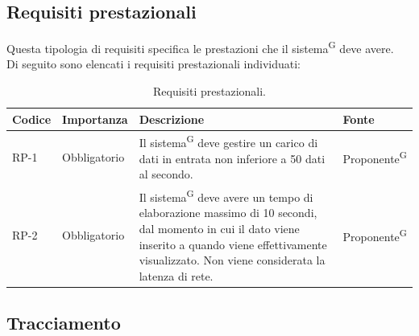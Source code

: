 \documentclass[8pt]{article}
\newcommand{\glossterm}[1]{#1\textsuperscript{G}} %
\begin{document}
\subsection{Requisiti prestazionali}
Questa tipologia di requisiti specifica le prestazioni che il \glossterm{sistema} deve avere. \\
Di seguito sono elencati i requisiti prestazionali individuati:
\begin{longtable}{|>{\centering\arraybackslash}p{1.2cm}|>{\centering\arraybackslash}p{2cm}|>{\centering\arraybackslash}p{8.5cm}|>{\centering\arraybackslash}p{3cm}|}
    \hline
    \rowcolor{white}
    \textbf{Codice} & \textbf{Importanza} & \textbf{Descrizione} & \textbf{Fonte} \\
		\hline
  \endfirsthead
\rowcolor{white}
\caption{Requisiti prestazionali.}
	\label{table:Requisiti prestazionali}
  \endlastfoot
            RP-1 & Obbligatorio & Il \glossterm{sistema} deve gestire un carico di dati in entrata non inferiore a 50 dati al secondo. & \glossterm{Proponente} \\ \hline
            RP-2 & Obbligatorio & Il \glossterm{sistema} deve avere un tempo di elaborazione massimo di 10 secondi, dal momento in cui il dato viene inserito a quando viene effettivamente visualizzato. Non viene considerata la latenza di rete. & \glossterm{Proponente} \\ \hline
\end{longtable}
\subsection{Tracciamento} \label{sec:track}
\end{document}
